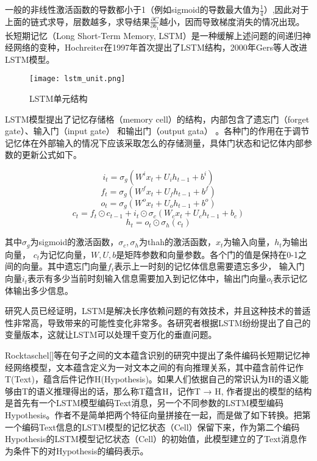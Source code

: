 一般的非线性激活函数的导数都小于1（例如sigmoid的导数最大值为$\frac{1}{4}$）,因此对于上面的链式求导，层数越多，求导结果$\frac{\partial C}{\partial b_1}$越小，因而导致梯度消失的情况出现。
长短期记忆（Long Short-Term Memory, LSTM）是一种缓解上述问题的间递归神经网络的变种，Hochreiter在1997年首次提出了LSTM结构，2000年Gers等人改进LSTM模型。

\begin{figure}[htbp]
	\centering
	\texttt{[image: lstm\_unit.png]}
	\caption[rnn_vanish]{LSTM单元结构}
\end{figure}

LSTM模型提出了记忆存储格（memory cell）的结构，内部包含了遗忘门（forget gate）、输入门（input gate） 和输出门（output gata） 。各种门的作用在于调节记忆体在外部输入的情况下应该采取怎么的存储测量，具体门状态和记忆体内部参数的更新公式如下。

\begin{equation}\label{lstm_f}i_t=\sigma_g(W^ix_t+U_ih_{t-1}+b^i)\end{equation}
\begin{equation}\label{lstm_f}f_t=\sigma_g(W^fx_t+U_fh_{t-1}+b^f)\end{equation}
\begin{equation}\label{lstm_f}o_t=\sigma_g(W^ox_t+U_oh_{t-1}+b^o)\end{equation}
\begin{equation}\label{lstm_f}c_t=f_t \odot c_{t-1}+i_t\odot \sigma_c(W_cx_t+U_ch_{t-1}+b_c)\end{equation}
\begin{equation}\label{lstm_f}h_t=o_t \odot \sigma_h(c_t)\end{equation}

其中$\sigma_g$为sigmoid的激活函数，$\sigma_c, \sigma_h$为thah的激活函数，$x_t$为输入向量，$h_t$为输出向量， $c_t$为记忆向量，$W,U,b$是矩阵参数和向量参数。各个门的值是保持在0-1之间的向量。其中遗忘门向量$f_t$表示上一时刻的记忆体信息需要遗忘多少， 输入门向量$i_t$表示有多少当前时刻输入信息需要加入到记忆体中，输出门向量$o_t$表示记忆体输出多少信息。

研究人员已经证明，LSTM是解决长序依赖问题的有效技术，并且这种技术的普适性非常高，导致带来的可能性变化非常多。各研究者根据LSTM纷纷提出了自己的变量版本，这就让LSTM可以处理千变万化的垂直问题。

Rocktaschel[]等在句子之间的文本蕴含识别的研究中提出了条件编码长短期记忆神经网络模型，文本蕴含定义为一对文本之间的有向推理关系，其中蕴含前件记作T(Text)，蕴含后件记作H(Hypothesis)。如果人们依据自己的常识认为H的语义能够由T的语义推理得出的话，那么称T蕴含H，记作T → H, 作者提出的模型的结构是首先有一个LSTM模型编码Text消息，另一个不同参数的LSTM模型编码Hypothesis。作者不是简单把两个特征向量拼接在一起，而是做了如下转换。把第一个编码Text信息的LSTM模型的记忆状态（Cell）保留下来，作为第二个编码Hypothesis的LSTM模型记忆状态（Cell）的初始值，此模型建立的了Text消息作为条件下的对Hypothesis的编码表示。

